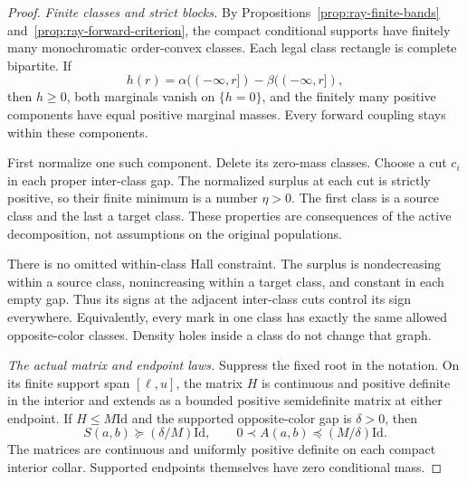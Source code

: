 \documentclass[11pt,reqno]{amsart}
\theoremstyle{definition}
\theoremstyle{remark}
\numberwithin{equation}{section}
\begin{document}
\begin{proof}
\emph{Finite classes and strict blocks.}
By Propositions~\ref{prop:ray-finite-bands}
and~\ref{prop:ray-forward-criterion}, the compact conditional supports
have finitely many monochromatic order-convex classes. Each legal class
rectangle is complete bipartite. If
\[
 h(r)=\alpha((-\infty,r])-\beta((-\infty,r]),
\]
then \(h\ge0\), both marginals vanish on \(\{h=0\}\), and
the finitely many positive components have equal positive marginal
masses. Every forward coupling stays within these components.

First normalize one such component. Delete its zero-mass classes.
Choose a cut \(c_i\) in each proper inter-class gap. The normalized
surplus at each cut is strictly positive, so their finite minimum
is a number \(\eta>0\). The first class is a source class and the
last a target class. These properties are consequences of the active
decomposition, not assumptions on the original populations.

There is no omitted within-class Hall constraint. The surplus is
nondecreasing within a source class, nonincreasing within a target
class, and constant in each empty gap. Thus its signs at the adjacent
inter-class cuts control its sign everywhere. Equivalently, every
mark in one class has exactly the same allowed opposite-color
classes. Density holes inside a class do not change that graph.

\emph{The actual matrix and endpoint laws.}
Suppress the fixed root in the notation. On its finite support span
\([\ell,u]\), the matrix \(H\) is continuous and positive definite
in the interior and extends as a bounded positive semidefinite
matrix at either endpoint. If \(H\le M\mathrm{Id}\) and
the supported opposite-color gap is \(\delta>0\), then
\begin{equation}
 S(a,b)\succeq(\delta/M)\mathrm{Id},\qquad
 0\prec A(a,b)\preceq(M/\delta)\mathrm{Id}.
 \label{eq:interleaved-root-matrix-bound}
\end{equation}
The matrices are continuous and uniformly positive definite on
each compact interior collar. Supported endpoints themselves have
zero conditional mass.


\end{proof}
\end{document}
